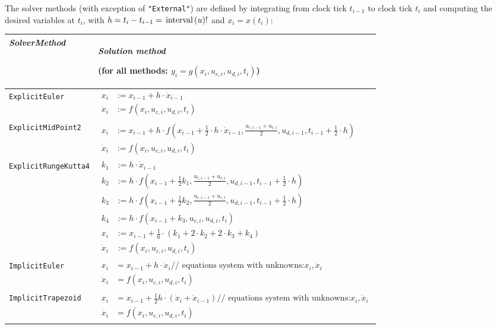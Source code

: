 The solver methods (with exception of \lstinline!"External"!) are defined by
integrating from clock tick $t_{i-1}$ to clock tick
$t_{i}$ and computing the desired variables at
$t_{i}$, with $h = t_{i} - t_{i-1} = \text{\lstinline!interval!}(u)!$ and
$x_{i} = x(t_{i})$:
\begin{longtable}[]{|p{3.5cm}|p{11cm}|}
\hline
\emph{SolverMethod} &
\emph{Solution method}

(for all methods: $y_i=g(x_i,u_{c,i},u_{d,i},t_i)$)\\ \hline
\endhead
\lstinline!ExplicitEuler! &
$\begin{aligned}
x_{i} &:= x_{i-1}+h\cdot\dot{x}_{i-1}\\
\dot{x}_{i} &:= f(x_i,u_{c,i},u_{d,i},t_i)
\end{aligned}$\\ \hline
\lstinline!ExplicitMidPoint2! &
$\begin{aligned}
x_{i} &:= x_{i-1}+h\cdot f(x_{i-1}+\frac{1}{2}\cdot h \cdot\dot{x}_{i-1},\frac{u_{c,i-1}+u_{c,i}}{2},u_{d,i-1},t_{i-1}+\tfrac{1}{2}\cdot h)\\
\dot{x}_{i} &:= f(x_i,u_{c,i},u_{d,i},t_i)
\end{aligned}$\\ \hline
\lstinline!ExplicitRungeKutta4! &
$\begin{aligned}
k_1 &:= h\cdot \dot{x}_{i-1}\\
k_2 &:= h\cdot f(x_{i-1}+\tfrac{1}{2}k_1,\frac{u_{c,i-1}+u_{c,i}}{2},u_{d,i-1},t_{i-1}+\tfrac{1}{2}\cdot h)\\
k_3 &:= h\cdot f(x_{i-1}+\tfrac{1}{2}k_2,\frac{u_{c,i-1}+u_{c,i}}{2},u_{d,i-1},t_{i-1}+\tfrac{1}{2}\cdot h)\\
k_4 &:= h\cdot f(x_{i-1}+k_3,u_{c,i},u_{d,i},t_i)\\
x_{i} &:= x_{i-1}+\tfrac{1}{6}\cdot(k_1+2\cdot k_2+2\cdot k_3+k_4)\\
\dot{x}_{i} &:= f(x_i,u_{c,i},u_{d,i},t_i)
\end{aligned}$
\\ \hline
\lstinline!ImplicitEuler! &$\begin{aligned}
x_{i} &= x_{i-1}+h\cdot\dot{x}_i \textrm{// equations system with unknowns:} x_i,\dot{x}_i\\
\dot{x}_{i} &= f(x_i,u_{c,i},u_{d,i},t_i)
\end{aligned}$\\ \hline
\lstinline!ImplicitTrapezoid! &$\begin{aligned}
x_{i} &= x_{i-1}+\tfrac{1}{2}h\cdot(\dot{x}_i+\dot{x}_{i-1}) \textrm{// equations system with unknowns:} x_i,\dot{x}_i\\
\dot{x}_{i} &= f(x_i,u_{c,i},u_{d,i},t_i)
\end{aligned}$\\ \hline
\end{longtable}

